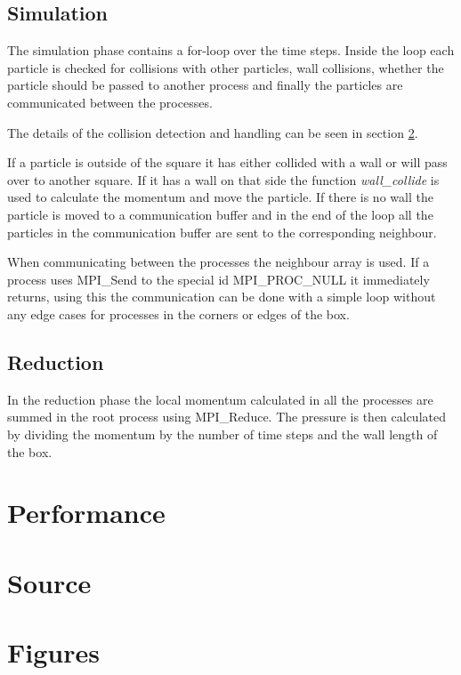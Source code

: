 \documentclass[a4paper, 12pt]{article}
\begin{document}
\subsection{Simulation}
The simulation phase contains a for-loop over the time steps. Inside the loop
each particle is checked for collisions with other particles, wall collisions,
whether the particle should be passed to another process and finally the
particles are communicated between the processes.

The details of the collision detection and handling can be seen in section
\ref{sec:src}.

If a particle is outside of the square it has either collided with a wall or
will pass over to another square. If it has a wall on that side the function
\textit{wall\_collide} is used to calculate the momentum and move the particle.
If there is no wall the particle is moved to a communication buffer and in the
end of the loop all the particles in the communication buffer are sent to the
corresponding neighbour.

When communicating between the processes the neighbour array is used. If a
process uses MPI\_Send to the special id MPI\_PROC\_NULL it immediately returns,
using this the communication can be done with a simple loop without any edge cases
for processes in the corners or edges of the box.

\subsection{Reduction}
In the reduction phase the local momentum calculated in all the processes are
summed in the root process using MPI\_Reduce. The pressure is then calculated
by dividing the momentum by the number of time steps and the wall length of the
box.

\section{Performance}
\section{Source}
\label{sec:src}

\newpage
\appendix
\section{Figures}
\label{sec:fig}
\end{document}
